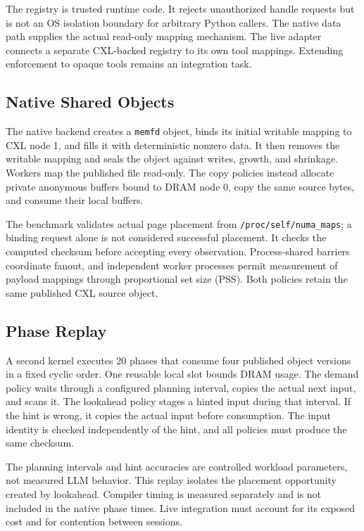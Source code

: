 \documentclass[letterpaper,twocolumn,10pt]{article}
\begin{document}
The registry is trusted runtime code. It rejects unauthorized handle requests
but is not an OS isolation boundary for arbitrary Python callers. The native
data path supplies the actual read-only mapping mechanism. The live adapter
connects a separate CXL-backed registry to its own tool mappings. Extending
enforcement to opaque tools remains an integration task.

\subsection{Native Shared Objects}

The native backend creates a \texttt{memfd} object, binds its initial writable
mapping to CXL node 1, and fills it with deterministic nonzero data. It then
removes the writable mapping and seals the object against writes, growth,
and shrinkage. Workers map the published file read-only. The copy policies
instead allocate private anonymous buffers bound to DRAM node 0, copy the
same source bytes, and consume their local buffers.

The benchmark validates actual page placement from
\texttt{/proc/self/numa\_maps}; a binding request alone is not considered
successful placement. It checks the computed checksum before accepting every
observation. Process-shared barriers coordinate fanout, and independent worker
processes permit measurement of payload mappings through proportional set
size (PSS). Both policies retain the same published CXL source object.

\subsection{Phase Replay}

A second kernel executes 20 phases that consume four published object
versions in a fixed cyclic order. One reusable local slot bounds DRAM usage.
The demand policy waits through a configured planning interval, copies the
actual next input, and scans it. The lookahead policy stages a hinted input
during that interval. If the hint is wrong, it copies the actual input before
consumption. The input identity is checked independently of the hint, and
all policies must produce the same checksum.

The planning intervals and hint accuracies are controlled workload parameters,
not measured LLM behavior. This replay isolates the placement opportunity
created by lookahead. Compiler timing is measured separately and is not
included in the native phase times. Live integration must account for its
exposed cost and for contention between sessions.
\end{document}
